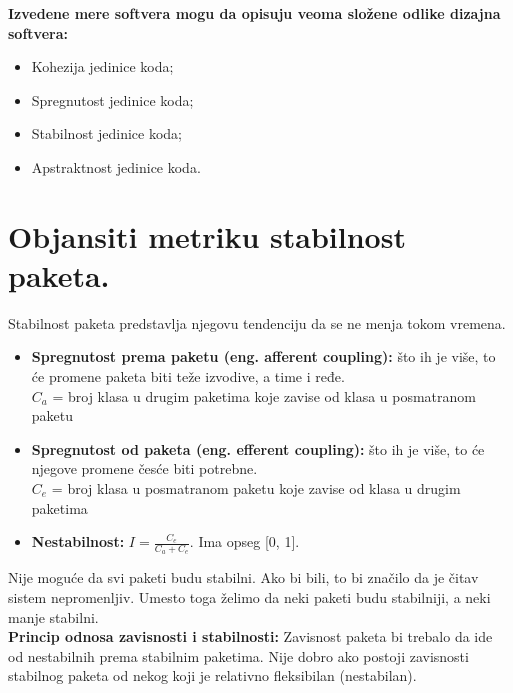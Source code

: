 \documentclass[a4paper]{article}
\begin{document}
  \textbf{Izvedene mere softvera mogu da opisuju veoma složene odlike dizajna softvera:}
  \begin{itemize}
    \item Kohezija jedinice koda;
    \item Spregnutost jedinice koda;
    \item Stabilnost jedinice koda;
    \item Apstraktnost jedinice koda.
  \end{itemize}

\section{Objansiti metriku stabilnost paketa.}
  Stabilnost paketa predstavlja njegovu tendenciju da se ne menja tokom vremena.
  \begin{itemize}
    \item \textbf{Spregnutost prema paketu (eng. afferent coupling):} 
          što ih je više, to će promene paketa biti teže izvodive, a time i ređe.\\
          $C_a$ = broj klasa u drugim paketima koje zavise od klasa u posmatranom paketu
    \item \textbf{Spregnutost od paketa (eng. efferent coupling):}
          što ih je više, to će njegove promene česće biti potrebne.\\
          $C_e$ = broj klasa u posmatranom paketu koje zavise od klasa u drugim paketima
    \item \textbf{Nestabilnost:} $I = \frac{C_e}{C_a + C_e}$. Ima opseg [0, 1].
  \end{itemize}
  Nije moguće da svi paketi budu stabilni. Ako bi bili, to bi značilo da je 
  čitav sistem nepromenljiv. Umesto toga želimo da neki paketi budu stabilniji, 
  a neki manje stabilni. \\
  
  \textbf{Princip odnosa zavisnosti i stabilnosti:} Zavisnost paketa bi trebalo da ide 
  od nestabilnih prema stabilnim paketima. 
  Nije dobro ako postoji zavisnosti stabilnog paketa od nekog koji je relativno 
  fleksibilan (nestabilan).\\
\end{document}
